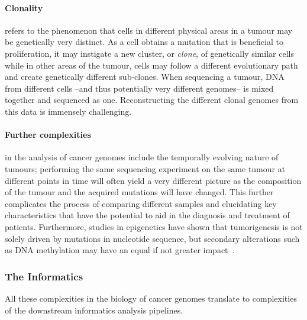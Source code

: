 \begin{justify}


\paragraph{Clonality} refers to the phenomenon that cells in different physical areas in a tumour may be genetically very distinct. As a cell obtains a mutation that is beneficial to proliferation, it may instigate a new cluster, or \textit{clone}, of genetically similar cells while in other areas of the tumour, cells may follow a different evolutionary path and create genetically different sub-clones. When sequencing a tumour, DNA from different cells --and thus potentially very different genomes-- is mixed together and sequenced as one. Reconstructing the different clonal genomes from this data is immensely challenging.

\paragraph{Further complexities} in the analysis of cancer genomes include the temporally evolving nature of tumours; performing the same sequencing experiment on the same tumour at different points in time will often yield a very different picture as the composition of the tumour and the acquired mutations will have changed. This further complicates the process of comparing different samples and elucidating key characteristics that have the potential to aid in the diagnosis and treatment of patients. Furthermore, studies in epigenetics have shown that tumorigenesis is not solely driven by mutations in nucleotide sequence, but secondary alterations such as DNA methylation may have an equal if not greater impact~\cite{pacchierotti2015environmental}.

\subsubsection{The Informatics}

All these complexities in the biology of cancer genomes translate to complexities of the downstream informatics analysis pipelines.


\end{justify}
